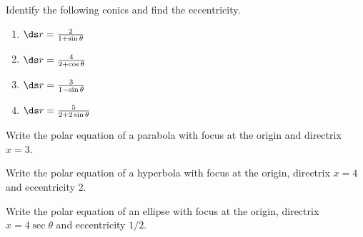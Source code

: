 \begin{enumialphparenastyle}

\begin{ex}
\noindent Identify the following conics and find the eccentricity.
\begin{multicols}{2}
\begin{enumerate}
	\item	$\ds r=\frac{2}{1+\sin\theta}$
	\item	$\ds r=\frac{4}{2+\cos\theta}$
	\item	$\ds r=\frac{3}{1-\sin\theta}$
	\item	$\ds r=\frac{5}{2+2\sin\theta}$
\end{enumerate}
\end{multicols}
\end{ex}


\begin{ex}
Write the polar equation of a parabola with focus at the origin and directrix $x=3$.
\end{ex}

\begin{ex}
Write the polar equation of a hyperbola with focus at the origin, directrix $x=4$ and eccentricity $2$.
\end{ex}

\begin{ex}
Write the polar equation of an ellipse with focus at the origin, directrix $x=4\sec\theta$ and eccentricity $1/2$.
\end{ex}

\end{enumialphparenastyle}
